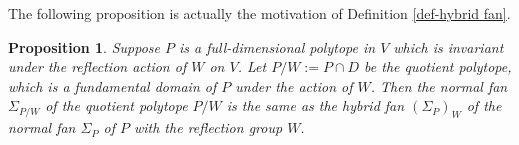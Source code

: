 \documentclass{amsart}
\newtheorem{proposition}[theorem]{Proposition}
\theoremstyle{definition}
\theoremstyle{remark}
\numberwithin{equation}{section}
\begin{document}

The following proposition is actually the motivation of Definition \ref{def-hybrid fan}.
\begin{proposition} \label{prop-polytopal}
Suppose $P$ is a full-dimensional polytope in $V$ which is invariant under the reflection action of $W$ on $V$. Let $P/W:=P \cap D$ be the quotient polytope, which is a fundamental domain of $P$ under the action of $W$. Then the normal fan $\Sigma_{P/W}$ of the quotient polytope $P/W$ is the same as the hybrid fan $(\Sigma_P)_W$ of the normal fan $\Sigma_P$ of $P$ with the reflection group $W$.
\end{proposition} 
\end{document}
